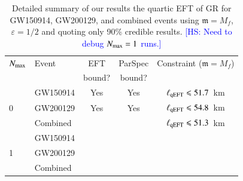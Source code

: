 \documentclass[twocolumn,
               prd,
               aps,
               superscriptaddress,
               tightenlines,
               nofootinbib,
               eqsecnum,
               amsfonts,
               amsmath,
               longbibliography]{revtex4-1}
\newcommand{\gm}{\mathfrak{m}}
\newcommand{\hs}[1]{{\textcolor{blue}{{[HS: #1]}} }}
\begin{document}
\begin{table}[h]
\begin{tabular}{l l c c c}
\hline
\hline
$N_{\rm max}$ & Event & EFT    & ParSpec & Constraint ($\gm = M_{f}$) \\
              &       & bound? & bound?  &                            \\
\hline
  & GW150914 & Yes & Yes  & $\ell_{\rm qEFT} \leqslant 51.7$~km \\
0 & GW200129 & Yes & Yes  & $\ell_{\rm qEFT} \leqslant 54.8$~km \\
  & Combined &     &      & \cellcolor{black!10}$\ell_{\rm qEFT} \leqslant 51.3$~km \\
\hline
  & GW150914 &  &     &    \\
1 & GW200129 &  &     &    \\
  & Combined &  &     &    \\
\hline
\hline
\end{tabular}
\caption{Detailed summary of our results the quartic EFT of GR for GW150914, GW200129, and
combined events using $\gm = M_{f}$, $\varepsilon = 1/2$ and quoting only 90\% credible results.
%
\hs{Need to debug $N_{\rm max} = 1$ runs.}
%
}
\label{tab:summary_qeft}
\end{table}

%
\end{document}
